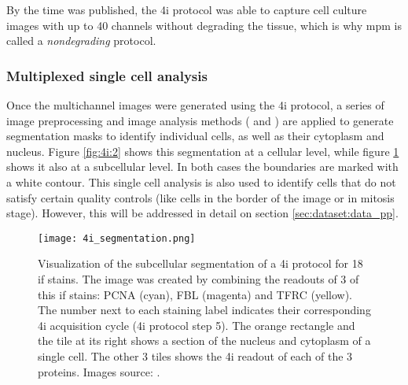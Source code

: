 By the time \cite{Guteaar7042} was published, the \gls{4i} protocol was able to capture cell culture images with up to 40 channels without degrading the tissue, which is why \gls{mpm} is called a \textit{nondegrading} protocol.

\subsubsection{Multiplexed single cell analysis}

Once the multichannel images were generated using the \gls{4i} protocol, a series of image preprocessing and image analysis methods (\cite{Carpenter2006} and \cite{snijder2012single}) are applied to generate segmentation masks to identify individual cells, as well as their cytoplasm and nucleus. Figure \ref{fig:4i:2} shows this segmentation at a cellular level, while figure \ref{fig:4i:segmentation} shows it also at a subcellular level. In both cases the boundaries are marked with a white contour. This single cell analysis is also used to identify cells that do not satisfy certain quality controls (like cells in the border of the image or in mitosis stage). However, this will be addressed in detail on section \ref{sec:dataset:data_pp}.

\begin{figure}[htb]
  \centering
  \texttt{[image: 4i\_segmentation.png]}
  \caption{Visualization of the subcellular segmentation of a \gls{4i} protocol for 18 \gls{if} stains. The image was created by combining the readouts of 3 of this \gls{if} stains: PCNA (cyan), FBL (magenta) and TFRC (yellow). The number next to each staining label indicates their corresponding 4i acquisition cycle (\gls{4i} protocol step 5). The orange rectangle and the tile at its right shows a section of the nucleus and cytoplasm of a single cell. The other 3 tiles shows the \gls{4i} readout of each of the 3 proteins. Images source: \cite{Guteaar7042}.}
  \label{fig:4i:segmentation}
\end{figure}

